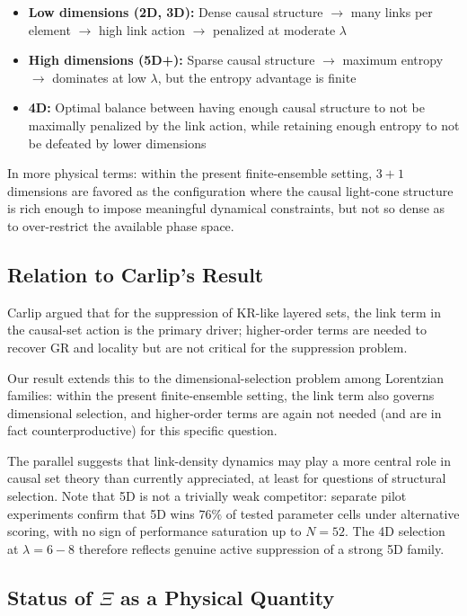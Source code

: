 \documentclass[12pt,a4paper]{article}
\begin{document}
\begin{itemize}
  \item \textbf{Low dimensions (2D, 3D):} Dense causal structure $\to$ many links per element
    $\to$ high link action $\to$ penalized at moderate $\lambda$
  \item \textbf{High dimensions (5D+):} Sparse causal structure $\to$ maximum entropy $\to$
    dominates at low $\lambda$, but the entropy advantage is finite
  \item \textbf{4D:} Optimal balance between having enough causal structure to not be maximally
    penalized by the link action, while retaining enough entropy to not be defeated by
    lower dimensions
\end{itemize}

In more physical terms: within the present finite-ensemble setting, $3{+}1$ dimensions
are favored as the configuration where the causal light-cone structure is rich enough to impose
meaningful dynamical constraints, but not so dense as to over-restrict the available phase space.

\subsection{Relation to Carlip's Result}
\label{sec:carlip}

Carlip \cite{Carlip2024} argued that for the suppression of KR-like layered sets,
the link term in the causal-set action is the primary driver;
higher-order terms are needed to recover GR and locality but are not critical
for the suppression problem.

Our result extends this to the dimensional-selection problem among Lorentzian families:
within the present finite-ensemble setting,
the link term also governs dimensional selection,
and higher-order terms are again not needed (and are in fact counterproductive)
for this specific question.

The parallel suggests that link-density dynamics may play a more central role
in causal set theory than currently appreciated, at least for questions of structural selection.
Note that 5D is not a trivially weak competitor: separate pilot experiments
confirm that 5D wins $76\%$ of tested parameter cells under alternative scoring,
with no sign of performance saturation up to $N = 52$.
The 4D selection at $\lambda = 6{-}8$ therefore reflects genuine active suppression
of a strong 5D family.

\subsection{Status of $\Xi$ as a Physical Quantity}
\label{sec:xi_status}
\end{document}
